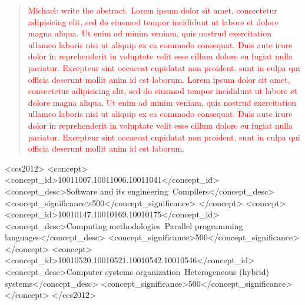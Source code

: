 \documentclass[acmtog,natbib=false]{acmart}
\newcommand{\todo}[1]{\textcolor{red}{#1}}
\begin{document}
\begin{abstract}
\todo{Michael: write the abstract.}
\todo{Lorem ipsum dolor sit amet, consectetur adipisicing elit, sed do eiusmod
tempor incididunt ut labore et dolore magna aliqua. Ut enim ad minim veniam,
quis nostrud exercitation ullamco laboris nisi ut aliquip ex ea commodo
consequat. Duis aute irure dolor in reprehenderit in voluptate velit esse
cillum dolore eu fugiat nulla pariatur. Excepteur sint occaecat cupidatat non
proident, sunt in culpa qui officia deserunt mollit anim id est laborum.
Lorem ipsum dolor sit amet, consectetur adipisicing elit, sed do eiusmod
tempor incididunt ut labore et dolore magna aliqua. Ut enim ad minim veniam,
quis nostrud exercitation ullamco laboris nisi ut aliquip ex ea commodo
consequat. Duis aute irure dolor in reprehenderit in voluptate velit esse
cillum dolore eu fugiat nulla pariatur. Excepteur sint occaecat cupidatat non
proident, sunt in culpa qui officia deserunt mollit anim id est laborum.}
\end{abstract}

\begin{CCSXML}
<ccs2012>
   <concept>
       <concept_id>10011007.10011006.10011041</concept_id>
       <concept_desc>Software and its engineering~Compilers</concept_desc>
       <concept_significance>500</concept_significance>
       </concept>
   <concept>
       <concept_id>10010147.10010169.10010175</concept_id>
       <concept_desc>Computing methodologies~Parallel programming languages</concept_desc>
       <concept_significance>500</concept_significance>
       </concept>
   <concept>
       <concept_id>10010520.10010521.10010542.10010546</concept_id>
       <concept_desc>Computer systems organization~Heterogeneous (hybrid) systems</concept_desc>
       <concept_significance>500</concept_significance>
       </concept>
 </ccs2012>
\end{CCSXML}



\maketitle
\end{document}
